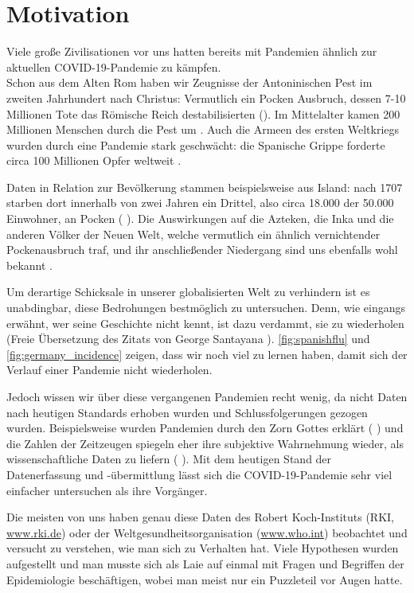 \chapter{Motivation}\label{chap:Motivation}
Viele große Zivilisationen vor uns hatten bereits mit Pandemien ähnlich zur aktuellen COVID-19-Pandemie zu kämpfen.\\
Schon aus dem Alten Rom haben wir Zeugnisse der Antoninischen Pest im zweiten Jahrhundert nach Christus: Vermutlich ein Pocken Ausbruch, dessen 7-10 Millionen Tote das Römische Reich destabilisierten (\autocite{RomPest}).%
Im Mittelalter kamen 200 Millionen Menschen durch die Pest um \autocite{PestMittelalter}.
Auch die Armeen des ersten Weltkriegs wurden durch eine Pandemie stark geschwächt: die Spanische Grippe forderte circa 100 Millionen Opfer weltweit \autocite{SpanischeGrippe}.

Daten in Relation zur Bevölkerung stammen beispielsweise aus Island: nach 1707 starben dort innerhalb von zwei Jahren ein Drittel, also circa  18.000 der 50.000 Einwohner, an Pocken (\autocite{americaPandemics}%
). Die Auswirkungen auf die Azteken, die Inka und die anderen Völker der Neuen Welt, welche vermutlich ein ähnlich vernichtender Pockenausbruch traf, und ihr anschließender Niedergang sind uns ebenfalls wohl bekannt \autocite{americaPandemics}.

Um derartige Schicksale in unserer globalisierten Welt zu verhindern ist es unabdingbar, diese Bedrohungen bestmöglich zu untersuchen. Denn, wie eingangs erwähnt, \glqq{}wer seine Geschichte nicht kennt, ist dazu verdammt, sie zu wiederholen\grqq{} (Freie Übersetzung des Zitats von George Santayana \autocite{history-quoteSantayana}).
\autoref{fig:spanishflu} und \autoref{fig:germany_incidence} zeigen, dass wir noch viel zu lernen haben, damit sich der Verlauf einer Pandemie nicht wiederholen.


Jedoch wissen wir über diese vergangenen Pandemien recht wenig, da nicht Daten nach heutigen Standards erhoben wurden und Schlussfolgerungen gezogen wurden. Beispielsweise wurden Pandemien durch den Zorn Gottes erklärt (\autocite{americaPandemics}%
) und die Zahlen der Zeitzeugen spiegeln eher ihre subjektive Wahrnehmung wieder, als wissenschaftliche Daten zu liefern (\autocite{americaPandemics}%
). Mit dem heutigen Stand der Datenerfassung und -übermittlung lässt sich die COVID-19-Pandemie sehr viel einfacher untersuchen als ihre Vorgänger.

Die meisten von uns haben genau diese Daten des Robert Koch-Instituts (RKI, \href{www.rki.de}{www.rki.de}) oder der Weltgesundheitsorganisation (\href{www.who.int}{www.who.int}) beobachtet und versucht zu verstehen, wie man sich zu Verhalten hat. Viele Hypothesen wurden aufgestellt und man musste sich als Laie auf einmal mit Fragen und Begriffen der Epidemiologie beschäftigen, wobei man meist nur ein Puzzleteil vor Augen hatte.

